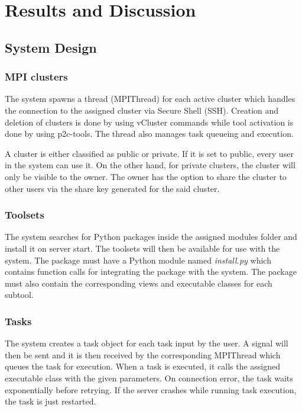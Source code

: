 \documentclass[journal]{./IEEE/IEEEtran}
\begin{document}
    
    


\section{Results and Discussion}
	\subsection{System Design}
		\subsubsection{MPI clusters} 
		The system spawns a thread (MPIThread) for each active cluster which handles the connection to the assigned cluster via Secure Shell (SSH). Creation and deletion of clusters is done by using vCluster commands while tool activation is done by using p2c-tools. The thread also manages task queueing and execution.
		
		A cluster is either classified as public or private. If it is set to public, every user in the system can use it. On the other hand, for private clusters, the cluster will only be visible to the owner. The owner has the option to share the cluster to other users via the share key generated for the said cluster. 		

		\subsubsection{Toolsets} 
		The system searches for Python packages inside the assigned modules folder and install it on server start. The toolsets will then be available for use with the system. The package must have a Python module named \emph{install.py} which contains function calls for integrating the package with the system. The package must also contain the corresponding views and executable classes for each subtool.  

		\subsubsection{Tasks} 
		The system creates a task object for each task input by the user. A signal will then be sent and it is then received by the corresponding MPIThread which queues the task for execution. When a task is executed, it calls the assigned executable class with the given parameters. On connection error, the task waits exponentially before retrying. If the server crashes while running task execution, the task is just restarted.				
		
\end{document}
